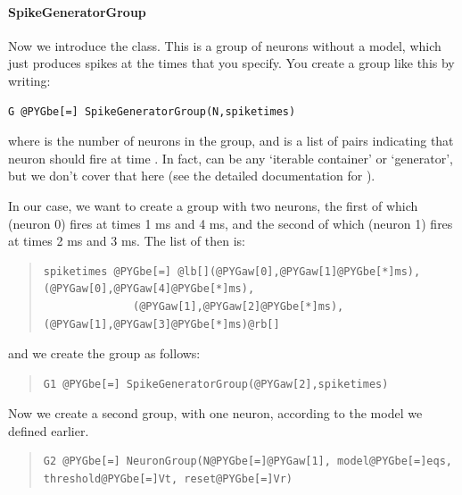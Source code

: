 \documentclass[letterpaper,10pt,english]{manual}
\begin{document}
\paragraph{SpikeGeneratorGroup}

Now we introduce the \hyperlink{brian.SpikeGeneratorGroup}{} class. This is a group of
neurons without a model, which just produces spikes at the times
that you specify. You create a group like this by writing:

\begin{Verbatim}[commandchars=@\[\]]
G @PYGbe[=] SpikeGeneratorGroup(N,spiketimes)
\end{Verbatim}

where  is the number of neurons in the group, and  is a
list of pairs  indicating that neuron  should fire at time .
In fact,  can be any `iterable container' or `generator',
but we don't cover that here (see the detailed documentation for
\hyperlink{brian.SpikeGeneratorGroup}{}).

In our case, we want to create a group with two neurons, the first
of which (neuron 0) fires at times 1 ms and 4 ms, and the second
of which (neuron 1) fires at times 2 ms and 3 ms. The list of
 then is:
\begin{quote}

\begin{Verbatim}[commandchars=@\[\]]
spiketimes @PYGbe[=] @lb[](@PYGaw[0],@PYGaw[1]@PYGbe[*]ms), (@PYGaw[0],@PYGaw[4]@PYGbe[*]ms),
              (@PYGaw[1],@PYGaw[2]@PYGbe[*]ms), (@PYGaw[1],@PYGaw[3]@PYGbe[*]ms)@rb[]
\end{Verbatim}
\end{quote}

and we create the group as follows:
\begin{quote}

\begin{Verbatim}[commandchars=@\[\]]
G1 @PYGbe[=] SpikeGeneratorGroup(@PYGaw[2],spiketimes)
\end{Verbatim}
\end{quote}

Now we create a second group, with one neuron, according to the
model we defined earlier.
\begin{quote}

\begin{Verbatim}[commandchars=@\[\]]
G2 @PYGbe[=] NeuronGroup(N@PYGbe[=]@PYGaw[1], model@PYGbe[=]eqs, threshold@PYGbe[=]Vt, reset@PYGbe[=]Vr)
\end{Verbatim}
\end{quote}
\end{document}
